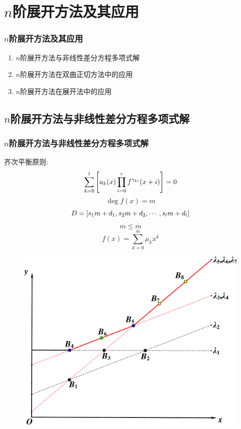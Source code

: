 \section{$n$阶展开方法及其应用}
\begin{frame}
\frametitle{$n$阶展开方法及其应用}
\begin{enumerate}
\item $n$阶展开方法与非线性差分方程多项式解 
\item $n$阶展开方法在双曲正切方法中的应用
\item $n$阶展开方法在\Painleve{}展开法中的应用
\end{enumerate}
\end{frame}

\subsection{$n$阶展开方法与非线性差分方程多项式解}
\begin{frame}
\frametitle{$n$阶展开方法与非线性差分方程多项式解}
齐次平衡原则: 
\[
    \sum_{k=0}^l{\left[a_k(x)\prod_{i=0}^r{f^{\gamma_{ki}}(x+i)}\right]}=0
\]
\[
    \deg f(x)=m
\]
\[
    D = \left[s_1 m+d_1,s_2 m+d_2,\cdots,s_l m+d_l\right]
\]
\[
    m\le \overline{m}
\]
\[
    f(x)=\sum_{k=0}^{\overline{m}}{\mu_k x^k}
\]  
\end{frame}

\begin{frame}
\begin{figure}
\centering
\includegraphics[height=0.9\textheight]{../paper/fig/ps.pdf}
\end{figure}
\end{frame}

